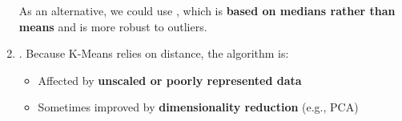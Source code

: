 \begin{enumerate}
    As an alternative, we could use , which is \textbf{based on medians rather than means} and is more robust to outliers.

    
    \item {}. Because K-Means relies on distance, the algorithm is:
    \begin{itemize}[label=\textcolor{Red2}{}]
        \item Affected by \textbf{unscaled or poorly represented data}
        \item Sometimes improved by \textbf{dimensionality reduction} (e.g., PCA)
    \end{itemize}
\end{enumerate}